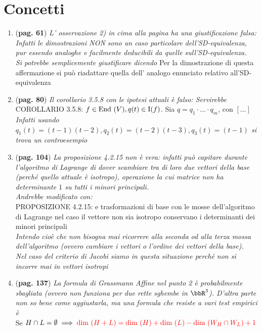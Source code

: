 \documentclass[a4paper,NoNotes,GeneralMath]{stdmdoc}
\newcommand{\omissis}{$\left[ \ldots \right]$\text{ }}
\newcommand{\err}[1]{\color{red}{#1}}
\begin{document}
	\section*{Concetti}
	\begin{enumerate}
		\item ({\bf pag. 61}) {\it L' osservazione 2) in cima alla pagina ha una giustificazione falsa: Infatti le dimostrazioni NON sono un caso particolare dell'SD-equivalenza, pur essendo analoghe e facilmente deducibili da quelle sull'SD-equivalenza. \\ Si potrebbe semplicemente giustificare dicendo }
		Per la dimostrazione di questa affermazione si può riadattare quella dell' analogo enunciato relativo all'SD-equivalenza
		\item ({\bf pag. 80}) {\it Il corollario 3.5.8 con le ipotesi attuali è falso: Servirebbe } \\
		COROLLARIO 3.5.8: $f\in\mbox{End }(V), q(t)\in\text{I}(f)$. Sia $q = q_1\cdot\ldots\cdot q_m$, con {\err{$\text{MCD }(q_i, q_j) = 1 \quad \text{ se }i\neq j$}} \omissis \\
		{\it Infatti usando $q_1(t) = (t-1)(t-2), q_2(t) = (t-2)(t-3), q_3(t) = (t-1)$ si trova un controesempio}
		\item ({\bf pag. 104}) {\it La proposizione 4.2.15 non è vera: infatti può capitare durante l'algoritmo di Lagrange di dover scambiare tra di loro due vettori della base (perché quello attuale è isotropo), operazione la cui matrice non ha determinante $1$ su tutti i minori principali. \\ Andrebbe modificato con: } \\
		PROPOSIZIONE 4.2.15: {\err Le trasformazioni di base con le mosse dell'algoritmo di Lagrange nel caso il vettore non sia isotropo conservano i determinanti dei minori principali} \\
		{\it Intendo cioè che non bisogna mai ricorrere alla seconda od alla terza mossa dell'algoritmo (ovvero cambiare i vettori o l'ordine dei vettori della base). \\ Nel caso del criterio di Jacobi siamo in questa situazione perché non si incorre mai in vettori isotropi}
		\item ({\bf pag. 137}) {\it La formula di Grassmann Affine nel punto 2 è probabilmente sbagliata (ovvero non funziona per due rette sghembe in $\bbR^3$). D'altra parte non so bene come aggiustarla, ma una formula che resiste a vari test empirici è } \\
		Se $H\cap L = \emptyset \implies {\err \Dim(H+L) = \Dim(H) + \Dim(L) - \Dim(W_H \cap W_L) +1}$
	\end{enumerate}
\end{document}
